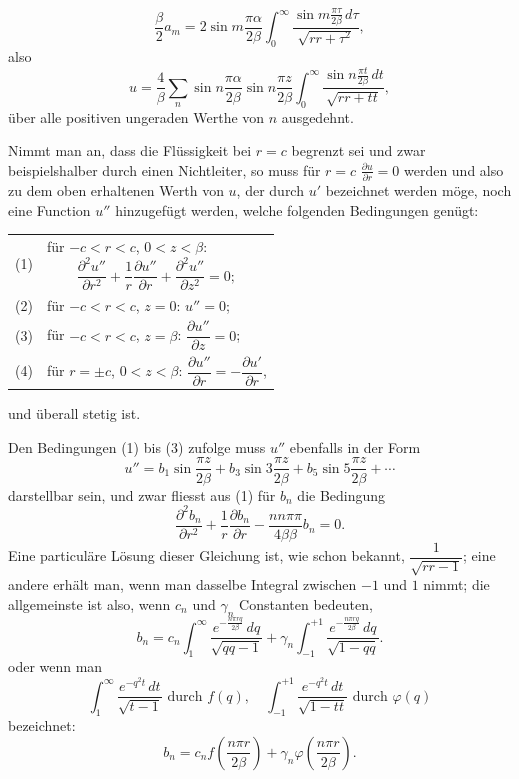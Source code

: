 \documentclass[12pt,a4paper]{book}
\theoremstyle{definition}
\theoremstyle{remark}
\begin{document}
\[
\frac{\beta}{2} a_m = 2 \sin m\frac{\pi \alpha}{2\beta} \int_0^\infty \frac{\sin m\frac{\pi \tau}{2\beta}\, d\tau}{\sqrt{rr + \tau^2}},
\]
also
\[
u = \frac{4}{\beta} \sum_n \sin n\frac{\pi \alpha}{2\beta} \sin n\frac{\pi z}{2\beta} \int_0^\infty \frac{\sin n\frac{\pi t}{2\beta}\, dt}{\sqrt{rr + tt}},
\]
über alle positiven ungeraden Werthe von $n$ ausgedehnt.

Nimmt man an, dass die Flüssigkeit bei $r = c$ begrenzt sei und zwar beispielshalber durch einen Nichtleiter, so muss für $r = c$ $\frac{\partial u}{\partial r} = 0$ werden und also zu dem oben erhaltenen Werth von $u$, der durch $u'$ bezeichnet werden möge, noch eine Function $u''$ hinzugefügt werden, welche folgenden Bedingungen genügt:

\medskip
\begin{tabular}{@{}l@{\quad}p{}@{}}
(1) & für $-c < r < c$, $0 < z < \beta$:
\[\frac{\partial^2 u''}{\partial r^2} + \frac{1}{r}\frac{\partial u''}{\partial r} + \frac{\partial^2 u''}{\partial z^2} = 0;\] \\[0.5em]
(2) & für $-c < r < c$, $z = 0$: $u'' = 0$; \\[0.3em]
(3) & für $-c < r < c$, $z = \beta$: $\dfrac{\partial u''}{\partial z} = 0$; \\[0.5em]
(4) & für $r = \pm c$, $0 < z < \beta$: $\dfrac{\partial u''}{\partial r} = -\dfrac{\partial u'}{\partial r}$,
\end{tabular}
\medskip

\noindent und überall stetig ist.

Den Bedingungen (1) bis (3) zufolge muss $u''$ ebenfalls in der Form
\[
u'' = b_1 \sin \frac{\pi z}{2\beta} + b_3 \sin 3\frac{\pi z}{2\beta} + b_5 \sin 5\frac{\pi z}{2\beta} + \cdots
\]
darstellbar sein, und zwar fliesst aus (1) für $b_n$ die Bedingung
\[
\frac{\partial^2 b_n}{\partial r^2} + \frac{1}{r}\frac{\partial b_n}{\partial r} - \frac{nn\pi\pi}{4\beta\beta} b_n = 0.
\]
Eine particuläre Lösung dieser Gleichung ist, wie schon bekannt, $\dfrac{1}{\sqrt{rr - 1}}$; eine andere erhält man, wenn man dasselbe Integral zwischen $-1$ und $1$ nimmt; die allgemeinste ist also, wenn $c_n$ und $\gamma_n$ Constanten bedeuten,
\[
b_n = c_n \int_1^\infty \frac{e^{-\frac{n\pi r q}{2\beta}}\, dq}{\sqrt{qq - 1}} + \gamma_n \int_{-1}^{+1} \frac{e^{-\frac{n\pi r q}{2\beta}}\, dq}{\sqrt{1 - qq}}.
\]
oder wenn man
\[
\int_1^\infty \frac{e^{-q^2 t}\, dt}{\sqrt{t-1}} \text{ durch } f(q), \quad \int_{-1}^{+1} \frac{e^{-q^2 t}\, dt}{\sqrt{1-tt}} \text{ durch } \varphi(q)
\]
bezeichnet:
\[
b_n = c_n f\left(\frac{n\pi r}{2\beta}\right) + \gamma_n \varphi\left(\frac{n\pi r}{2\beta}\right).
\]
\end{document}
